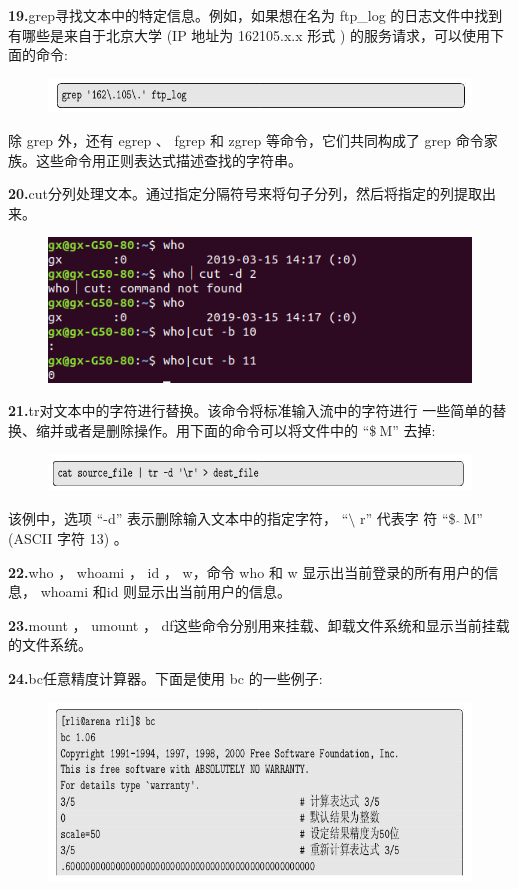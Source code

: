 \documentclass[12pt，a4paper]{article}
\numberwithin{equation}{section}
\begin{document}
\textbf{19.}grep寻找文本中的特定信息。例如，如果想在名为 ftp\_log 的日志文件中找到有哪些是来自于北京大学 (IP 地址为 162105.x.x 形式 )
的服务请求，可以使用下面的命令:
\begin{figure}[H]
\centering
\includegraphics[scale=0.6]{./figures/228.png}
\end{figure}
除 grep 外，还有 egrep 、 fgrep 和 zgrep 等命令，它们共同构成了 grep 命令家族。这些命令用正则表达式描述查找的字符串。

\textbf{20.}cut分列处理文本。通过指定分隔符号来将句子分列，然后将指定的列提取出来。
\begin{figure}[H]
\centering
\includegraphics[scale=0.6]{./figures/229.png}
\end{figure}

\textbf{21.}tr对文本中的字符进行替换。该命令将标准输入流中的字符进行
一些简单的替换、缩并或者是删除操作。用下面的命令可以将文件中的 “\$$\hat{}~$M”
去掉:
\begin{figure}[H]
\centering
\includegraphics[scale=0.6]{./figures/268.png}
\end{figure}
该例中，选项 “-d” 表示删除输入文本中的指定字符， “$\setminus$ r” 代表字
符 “\$ $\hat{}~$M” (ASCII 字符 13) 。

\textbf{22.}who ， whoami ， id ， w，命令 who 和 w 显示出当前登录的所有用户的信息， whoami 和id 则显示出当前用户的信息。

\textbf{23.}mount ， umount ， df这些命令分别用来挂载、卸载文件系统和显示当前挂载的文件系统。


\textbf{24.}bc任意精度计算器。下面是使用 bc 的一些例子:
\begin{figure}[H]
\centering
\includegraphics[scale=0.6]{./figures/230.png}
\end{figure}
\end{document}
